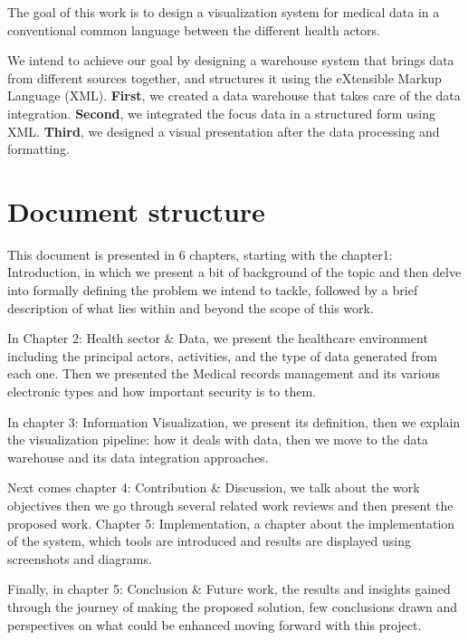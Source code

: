 The goal of this work is to design a visualization system for medical data in a conventional common language between the different health actors.
 
We intend to achieve our goal by designing a warehouse system that brings  data from different sources together, and structures it using the eXtensible Markup Language (XML).
 \newline
 \textbf{First}, we created a data warehouse that takes care of the data integration.\newline 
 \textbf{Second}, we integrated the focus data in a structured form using XML.\newline
 \textbf{Third}, we designed a visual presentation after the data processing and formatting.

 
\section{Document structure}
This document is presented in 6 chapters, starting with the chapter1: Introduction, in which we present a bit of background of the topic and then delve into formally defining the problem we intend to tackle, followed by a brief description of what lies within and beyond the scope of this work.
 
In Chapter 2: Health sector \& Data, we present the healthcare environment including the principal actors, activities, and the type of data generated from each one. Then we presented the Medical records management and its various electronic types and how important security is to them.
 
In chapter 3: Information Visualization, we present its definition, then we explain the visualization pipeline: how it deals with data, then we move to the data warehouse and its data integration approaches.
 
 Next comes chapter 4: Contribution \& Discussion, we talk about the work objectives then we go through several related work reviews and then present the proposed work. Chapter 5: Implementation, a chapter about the implementation of the system, which tools are introduced and results are displayed using screenshots and diagrams.
 
Finally, in chapter 5: Conclusion \& Future work, the results and insights gained through the journey of making the proposed solution, few conclusions drawn and perspectives on what could be enhanced moving forward with this project.
